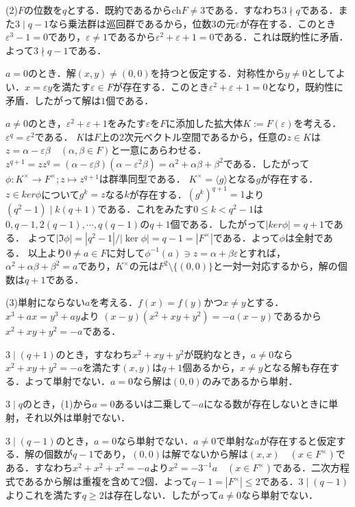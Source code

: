 \documentclass[
		book,
		head_space=20mm,
		foot_space=20mm,
		gutter=10mm,
		line_length=190mm
]{jlreq}
\begin{document}
(2)$F$の位数を$q$とする．既約であるから$\mathrm{ch}F \neq 3$である．すなわち$3 \nmid q$である．また$3 \mid q-1$なら乗法群は巡回群であるから，位数$3$の元$\varepsilon$が存在する．このとき$\varepsilon^3-1=0$であり，$\varepsilon \neq 1$であるから$\varepsilon^2+\varepsilon+1=0$である．これは既約性に矛盾．よって$3 \nmid q-1$である．

$a=0$のとき．解$(x,y)\neq (0,0)$を持つと仮定する．対称性から$y\neq 0$としてよい．$x=\varepsilon y$を満たす$\varepsilon\in F$が存在する．このとき$\varepsilon^2+\varepsilon+1=0$となり，既約性に矛盾．したがって解は$1$個である．

$a\neq 0$のとき，$\varepsilon^2+\varepsilon+1$をみたす$\varepsilon$を$F$に添加した拡大体$K:=F(\varepsilon)$を考える．$\varepsilon^{q}=\varepsilon^2$である．
$K$は$F$上の$2$次元ベクトル空間であるから，任意の$z \in K$は$z=\alpha-\varepsilon \beta \quad (\alpha,\beta \in F)$と一意にあらわせる．
$z^{q+1}=z z^q=(\alpha-\varepsilon \beta)(\alpha -\varepsilon^2 \beta)=\alpha^2+\alpha\beta +\beta^2$である．したがって$\phi\colon K^\times\rightarrow F^\times;z \mapsto z^{q+1}$は群準同型である．
$K^\times = \langle g \rangle$となる$g$が存在する．$z \in ker \phi$について$g^k=z$なる$k$が存在する．$(g^k)^{q+1}=1$より$(q^2-1)\mid k(q+1)$である．これをみたす$0\le k< q^2-1$は$0,q-1,2(q-1),\cdots,q(q-1)$の$q+1$個である．したがって$|ker \phi|=q+1$である．
よって$|\Im \phi|=|q^2-1|/|\ker \phi|=q-1=|F^\times|$である．よって$\phi$は全射である．
以上より$0\neq a \in F$に対して$\phi^{-1}(a)\ni z=\alpha+\beta \varepsilon$とすれば，$\alpha^2+\alpha \beta+\beta^2=a$であり，$K^\times$の元は$F^2\setminus \{ (0,0)\}$と一対一対応するから，解の個数は$q+1$である．

(3)単射にならない$a$を考える．$f(x)=f(y)$かつ$x\neq y$とする．$x^3+ax=y^3+ay$より
$(x-y)(x^2+xy+y^2)=-a(x-y)$であるから$x^2+xy+y^2=-a$である．

$3\mid (q+1)$のとき，すなわち$x^2+xy+y^2$が既約なとき，$a\neq 0$なら$x^2+xy+y^2=-a$を満たす$(x,y)$は$q+1$個あるから，$x\neq y$となる解も存在する．よって単射でない．$a=0$なら解は$(0,0)$のみであるから単射．

$3\mid q$のとき，(1)から$a=0$あるいは二乗して$-a$になる数が存在しないときに単射，それ以外は単射でない．

$3\mid (q-1)$のとき，$a=0$なら単射でない．$a\neq 0$で単射な$a$が存在すると仮定する．解の個数が$q-1$であり，$(0,0)$は解でないから解は$(x,x)\quad (x\in F^\times)$である．すなわち$x^2+x^2+x^2=-a$より$x^2=-3^{-1}a\quad (x \in F^\times)$である．二次方程式であるから解は重複を含めて$2$個．よって$q-1=|F^\times|\le 2$である．$3\mid (q-1)$よりこれを満たす$q\ge 2$は存在しない．したがって$a\neq 0$なら単射でない．
\end{document}
